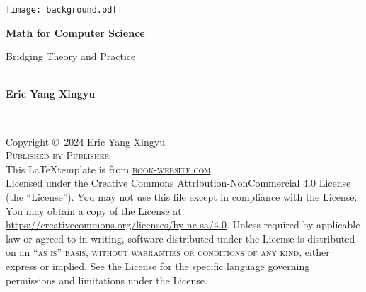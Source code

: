 \documentclass[
	12pt, %
	fleqn, %
	a4paper, %
]{LegrandOrangeBook}
\begin{document}

\titlepage %
	{\texttt{[image: background.pdf]}} %
	{ %
		\centering\sffamily %
		{\Huge\bfseries Math for Computer Science\par} %
		\vspace{16pt} %
		{\LARGE Bridging Theory and Practice} %
		\vspace{24pt} %
		{\huge\bfseries \\ Eric Yang Xingyu\par} %
	}


\thispagestyle{empty} %

~\vfill %

\noindent Copyright \copyright\ 2024 Eric Yang Xingyu\\ %

\noindent \textsc{Published by Publisher}\\ %
This \LaTeX \space template is from 
\noindent \textsc{\href{https://www.latextemplates.com/template/legrand-orange-book}{book-website.com}}\\ %

\noindent Licensed under the Creative Commons Attribution-NonCommercial 4.0 License (the ``License''). You may not use this file except in compliance with the License. You may obtain a copy of the License at \url{https://creativecommons.org/licenses/by-nc-sa/4.0}. Unless required by applicable law or agreed to in writing, software distributed under the License is distributed on an \textsc{``as is'' basis, without warranties or conditions of any kind}, either express or implied. See the License for the specific language governing permissions and limitations under the License.\\ %
\end{document}
